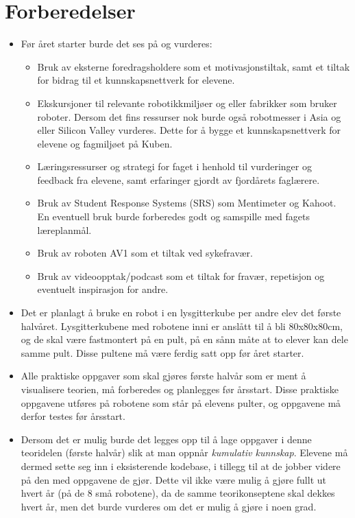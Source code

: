 \section{Forberedelser} \label{Sec: Forb}


    \begin{itemize}

        \item Før året starter burde det ses på og vurderes:

            \begin{itemize}
                \item Bruk av eksterne foredragsholdere som et motivasjonstiltak, samt et tiltak for bidrag til et kunnskapsnettverk for elevene.
                \item Ekskursjoner til relevante robotikkmiljøer og eller fabrikker som bruker roboter. Dersom det fins ressurser nok burde også robotmesser i Asia og eller Silicon Valley vurderes. Dette for å bygge et kunnskapsnettverk for elevene og fagmiljøet på Kuben.
                \item Læringsressurser og strategi for faget i henhold til vurderinger og feedback fra elevene, samt erfaringer gjordt av fjordårets faglærere.
                \item Bruk av Student Response Systems (SRS) som Mentimeter og Kahoot. En eventuell bruk burde forberedes godt og samspille med fagets læreplanmål.
                \item Bruk av roboten AV1 som et tiltak ved sykefravær.
                \item Bruk av videoopptak/podcast som et tiltak for fravær, repetisjon og eventuelt inspirasjon for andre.
            \end{itemize}


        \item Det er planlagt å bruke en robot i en lysgitterkube per andre elev det første halvåret. Lysgitterkubene med robotene inni er anslått til å bli 80x80x80cm, og de skal være fastmontert på en pult, på en sånn måte at to elever kan dele samme pult. Disse pultene må være ferdig satt opp før året starter.

        \item Alle praktiske oppgaver som skal gjøres første halvår som er ment å visualisere teorien, må forberedes og planlegges før årsstart. Disse praktiske oppgavene utføres på robotene som står på elevens pulter, og oppgavene må derfor testes før årsstart.

        \item Dersom det er mulig burde det legges opp til å lage oppgaver i denne teoridelen (første halvår) slik at man oppnår \emph{kumulativ kunnskap}. Elevene må dermed sette seg inn i eksisterende kodebase, i tillegg til at de jobber videre på den med oppgavene de gjør. Dette vil ikke være mulig å gjøre fullt ut hvert år (på de 8 små robotene), da de samme teorikonseptene skal dekkes hvert år, men det burde vurderes om det er mulig å gjøre i noen grad.


\end{itemize}
